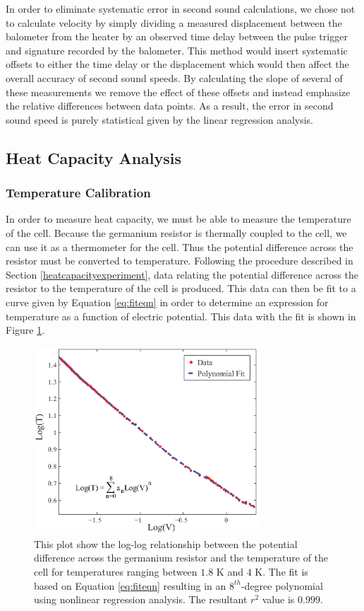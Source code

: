 In order to eliminate systematic error in second sound calculations, we chose not to calculate velocity by simply dividing a measured displacement between the balometer from the heater by an observed time delay between the pulse trigger and signature recorded by the balometer. This method would insert systematic offsets to either the time delay or the displacement which would then affect the overall accuracy of second sound speeds.  By calculating the slope of several of these measurements we remove the effect of these offsets and instead emphasize the relative differences between data points.  As a result, the error in second sound speed is purely statistical given by the linear regression analysis.  

\subsection{Heat Capacity Analysis}\label{heatcapacityanalysis}
\subsubsection{Temperature Calibration}\label{temperaturecalibration}

In order to measure heat capacity, we must be able to measure the temperature of the cell.  Because the germanium resistor is thermally coupled to the cell, we can use it as a thermometer for the cell.  Thus the potential difference across the resistor must be converted to temperature.  Following the procedure described in Section \ref{heatcapacityexperiment}, data relating the potential difference across the resistor to the temperature of the cell is produced.  This data can then be fit to a curve given by Equation \ref{eq:fiteqn} in order to determine an expression for temperature as a function of electric potential.  This data with the fit is shown in Figure \ref{fig:polyfit}.  

\begin{figure}[htbp]
\begin{center}
\includegraphics[height=70mm]{./figures/polyfit.eps}
\caption{\small{This plot show the log-log relationship between the potential difference across the germanium resistor and the temperature of the cell for temperatures ranging between $1.8$ K and $4$ K.  The fit is based on Equation \ref{eq:fiteqn} resulting in an $8^{th}$-degree polynomial using nonlinear regression analysis.  The resultant $r^{2}$ value is $0.999$.}}
\label{fig:polyfit}
\end{center}
\end{figure}

